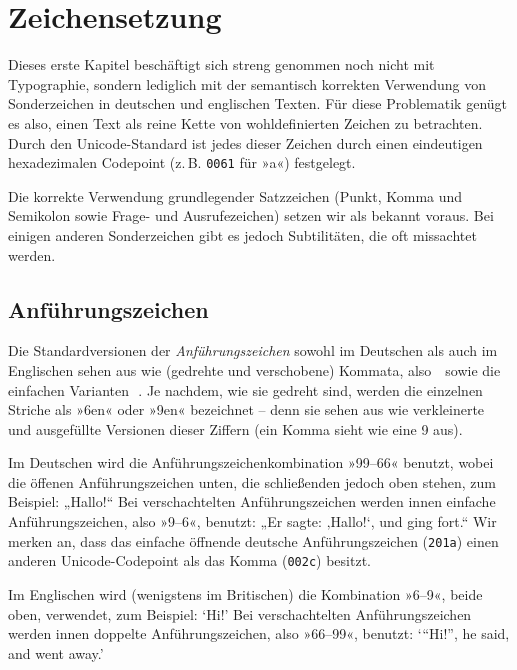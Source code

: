 \chapter{Zeichensetzung}

Dieses erste Kapitel beschäftigt sich streng genommen noch nicht mit
Typographie, sondern lediglich mit der semantisch korrekten Verwendung von
Sonderzeichen in deutschen und englischen Texten. Für diese Problematik genügt
es also, einen Text als reine Kette von wohldefinierten Zeichen zu betrachten.
Durch den Unicode-Standard ist jedes dieser Zeichen durch einen
eindeutigen hexadezimalen Codepoint (z.\,B. \texttt{0061} für »a«) festgelegt.

Die korrekte Verwendung grundlegender Satzzeichen (Punkt, Komma und Semikolon sowie
Frage- und Ausrufezeichen) setzen wir als bekannt voraus. Bei einigen
anderen Sonderzeichen gibt es jedoch Subtilitäten, die oft missachtet werden.

\section{Anführungszeichen}

Die Standardversionen der \emph{Anführungszeichen} sowohl im Deutschen als auch
im Englischen sehen aus wie (gedrehte und verschobene) Kommata, also
\,\, sowie die einfachen Varianten
\,\,.  Je nachdem, wie sie gedreht sind, werden die
einzelnen Striche als »6en« oder »9en« bezeichnet -- denn sie sehen
aus wie verkleinerte und ausgefüllte Versionen dieser Ziffern (ein Komma
\Char{,} sieht wie eine 9 aus).

Im Deutschen wird die Anführungszeichenkombination »99–66« benutzt, wobei die
öffenen Anführungszeichen unten, die schließenden jedoch oben stehen, zum
Beispiel: „Hallo!“ Bei verschachtelten Anführungszeichen werden innen einfache
Anführungszeichen, also »9–6«, benutzt: „Er sagte: ‚Hallo!{‘}, und ging fort.“
Wir merken an, dass das einfache öffnende deutsche Anführungszeichen 
(\texttt{201a}) einen anderen Unicode-Codepoint als das Komma \Char{,}
(\texttt{002c}) besitzt.

Im Englischen wird (wenigstens im Britischen) die Kombination »6–9«,
beide oben, verwendet, zum Beispiel: \foreignlanguage{british}{‘Hi!’}
Bei verschachtelten Anführungszeichen werden innen doppelte
Anführungszeichen, also »66–99«, benutzt:
\foreignlanguage{british}{‘“Hi!”, he said, and went away.’}

